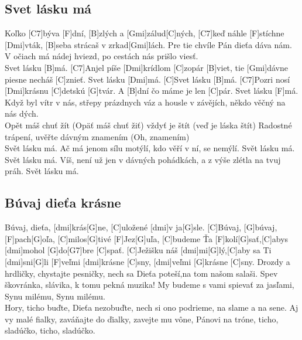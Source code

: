 \documentclass[10pt]{article}
\begin{document}
\begin{Large}
\begin{minipage}{\textwidth}
\subsection{Svet lásku má}
\begin{multicols}{2}
\begin{guitar}
	[C]Koľko [C7]býva [F]dní,
	[B]zlých a [Gmi]zálud[C]ných,
	[C7]keď náhle [F]stíchne [Dmi]vták,
	[B]seba strácaš v zrkad[Gmi]lách.
	Pre tie chvíle Pán
	dieťa dáva nám.
	V očiach má nádej hviezd,
	po cestách nás prišlo viesť.
	\\
	[C7]Svet lásku [B]má.
	[C7]Anjel píše [Dmi]krídlom [C]zopár [B]viet,
	tie [Gmi]dávne piesne necháš [C]znieť.
	Svet lásku [Dmi]má.
	[C]Svet lásku [B]má.
	[C7]Pozri nosí [Dmi]krásnu [C]detskú [G]tvár.
	A [B]dní čo máme je len [C]pár.
	Svet lásku [F]má.
	\columnbreak
	Když byl vítr v nás,
	střepy prázdnych váz
	a housle v závějích,
	někdo věčný na nás dých.
	\\
	Opět máš chuť žít (Opäť máš chuť žiť)
	vždyť je štít (veď je láska štít)
	Radostné trápení,
	uvěřte dávným znamením (Oh, znamením)
	\\
	Svět lásku má.
	Ač má jenom sílu motýlí,
	kdo věří v ní, se nemýlí.
	Svět lásku má.
	Svět lásku má.
	Víš, není už jen v dávných pohádkách,
	a z výše zlétla na tvuj práh.
	Svět lásku má.
\end{guitar}
\end{multicols}
\end{minipage}

\begin{minipage}{\textwidth}
\subsection{Búvaj dieťa krásne}
\begin{multicols}{2}
\begin{guitar}
	[C]Búvaj, dieťa, [dmi]krás[G]ne, [C]uložené [dmi]v ja[G]sle.
	[C]Búvaj, [G]búvaj, [F]pach[G]oľa, [C]milos[G]tivé [F]Jez[G]uľa,
	[C]budeme Ťa [F]kolí[G]sať,[C]abys [dmi]mohol [G]do[G7]bre [C]spať.
	[C]Ježišku náš [dmi]mi[G]lý,[C]aby sa Ti [dmi]sni[G]li
	[F]veľmi [dmi]krásne [C]sny, [dmi]veľmi [G]krásne [C]sny.
	\columnbreak
	Drozdy a hrdličky, chystajte pesničky,
	nech sa Dieťa poteší,na tom našom salaši.
	Spev škovránka, slávika, k tomu pekná muzika!
	My budeme s vami spievať za jasľami,
	Synu milému, Synu milému.
	\\
	Hory, ticho buďte, Dieťa nezobuďte,
	nech si ono podrieme, na slame a na sene.
	Aj vy malé fialky, zaváňajte do ďialky,
	zavejte mu vône, Pánovi na tróne,
	ticho, sladúčko, ticho, sladúčko.
\end{guitar}
\end{multicols}
\end{minipage}


\end{Large}
\end{document}
